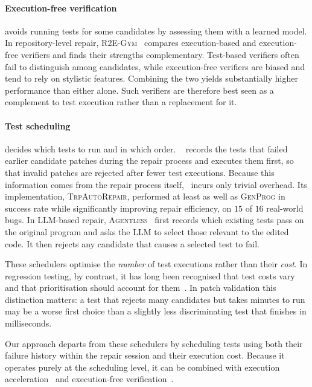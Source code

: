 \paragraph{Execution-free verification} avoids running tests for some candidates
by assessing them with a learned model. In repository-level repair,
\textsc{R2E-Gym}~\citep{jain2025r2egym} compares execution-based and
execution-free verifiers and finds their strengths complementary. Test-based
verifiers often fail to distinguish among candidates, while execution-free
verifiers are biased and tend to rely on stylistic features. Combining the two
yields substantially higher performance than either alone. Such verifiers are
therefore best seen as a complement to test execution rather than a replacement
for it.

\paragraph{Test scheduling} decides which tests to run and in which order.
\frtp~\citep{qi2013frtp} records the tests that failed earlier candidate patches
during the repair process and executes them first, so that invalid patches are
rejected after fewer test executions. Because this information comes from the
repair process itself, \frtp\ incurs only trivial overhead. Its implementation,
\textsc{TrpAutoRepair}, performed at least as well as \textsc{GenProg} in
success rate while significantly improving repair efficiency, on $15$ of $16$
real-world bugs. In
LLM-based repair, \textsc{Agentless}~\citep{xia2025agentless} first records
which existing tests pass on the original program and asks the LLM to select
those relevant to the edited code. It then rejects any candidate that causes a
selected test to fail.

These schedulers optimise the \emph{number} of test executions rather than their
\emph{cost}. In regression testing, by contrast, it has long been recognised
that test costs vary and that prioritisation should account for
them~\citep{elbaum2001cost}. In patch validation this distinction matters: a
test that rejects many candidates but takes minutes to run may be a worse first
choice than a slightly less discriminating test that finishes in milliseconds.

Our approach departs from these schedulers by scheduling tests using both their
failure history within the repair session and their execution cost. Because it
operates purely at the scheduling level, it can be combined with execution
acceleration~\citep{chen2021uniapr,xiao2024expressapr} and execution-free
verification~\citep{jain2025r2egym}.

